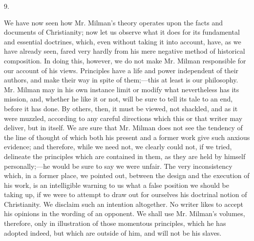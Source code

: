 9.

We have now seen how Mr. Milman's theory operates
upon the facts and documents of Christianity; now let us observe what
it does for its fundamental and essential doctrines, which, even
without taking it into account, have, as we have already seen, fared
very hardly from his mere negative method of historical composition.
In doing this, however, we do not make Mr. Milman responsible for our
account of his views. Principles have a life and power independent of
their authors, and make their way in spite of them;—this at least is
our philosophy. Mr. Milman may in his own instance limit or modify
what nevertheless has its mission, and, whether he like it or not,
will be sure to tell its tale to an end, before it has done. By
others, then, it must be viewed, not shackled, and as it were muzzled,
according to any careful directions which this or that writer may
deliver, but in itself. We are sure that Mr. Milman does not see the
tendency of the line of thought of which both his present and a former
work give such anxious evidence; and therefore, while we need not, we
clearly could not, if we tried, delineate the principles which are
contained in them, as they are held by himself personally;—he would
be sure to say we were unfair. The very inconsistency which, in a
former place, we pointed out, between the design and the execution of
his work, is an intelligible warning to us what a false position we
should be taking up, if we were to attempt to draw out for ourselves
his doctrinal notion of Christianity. We disclaim such an intention
altogether. No writer likes to accept his opinions in the wording of
an opponent. We shall use Mr. Milman's volumes, therefore, only in
illustration of those momentous principles, which he has adopted
indeed, but which are outside of him, and will not be his slaves.

